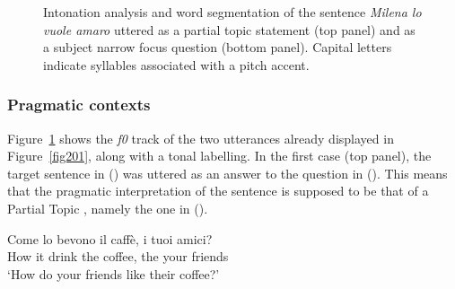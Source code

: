 \begin{figure}
\centering
{}
\caption{Intonation analysis and word segmentation of the sentence \textit{Milena lo vuole amaro} uttered as a partial topic statement (top panel) and as a subject narrow focus question (bottom panel). Capital letters indicate syllables associated with a pitch accent.}
\label{fig202}\end{figure}

\subsubsection{Pragmatic contexts}\label{sec2121}
Figure~\ref{fig202} shows the \textit{f0} track of the two utterances already displayed in Figure~\ref{fig201}, along with a tonal labelling. In the first case (top panel), the target sentence in () was uttered as an answer to the question in (). This means that the pragmatic interpretation of the sentence is supposed to be that of a Partial Topic \citep{buring1997meaning}, namely the one in ().

\ea
\gll Come lo bevono il caffè, i tuoi amici?\footnotemark\\
How it drink the coffee, the your friends\\
\glt ‘How do your friends like their coffee?’
\z

